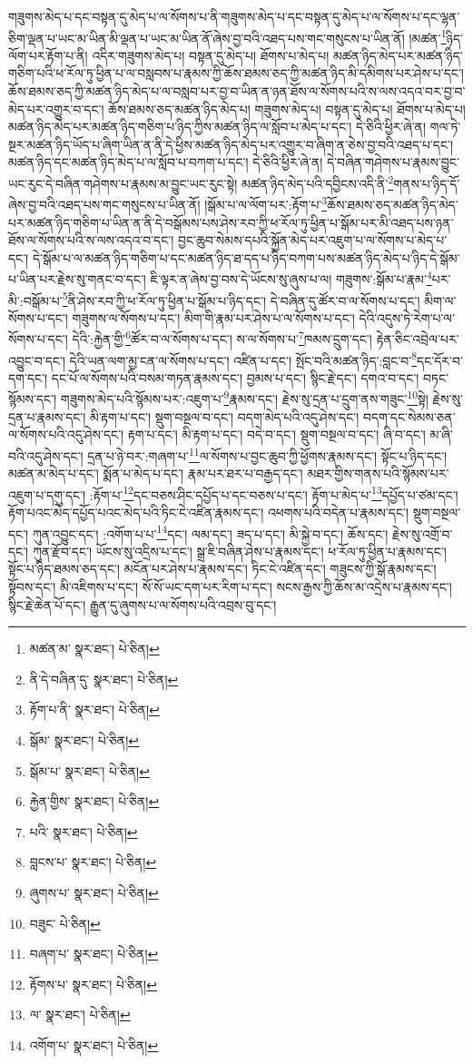 གཟུགས་མེད་པ་དང་བསྟན་དུ་མེད་པ་ལ་སོགས་པ་ནི་གཟུགས་མེད་པ་དང་བསྟན་དུ་མེད་པ་ལ་སོགས་པ་དང་ལྷན་ཅིག་ལྡན་པ་ཡང་མ་ཡིན་མི་ལྡན་པ་ཡང་མ་ཡིན་ནོ་ཞེས་བྱ་བའི་འཐད་པས་གང་གསུངས་པ་ཡིན་ནོ། །མཚན་\footnote{མཚན་མ་  སྣར་ཐང་།  པེ་ཅིན། }ཉིད་ལོག་པར་རྟོག་པ་ནི། འདིར་གཟུགས་མེད་པ། བསྟན་དུ་མེད་པ། ཐོགས་པ་མེད་པ། མཚན་ཉིད་མེད་པར་མཚན་ཉིད་གཅིག་པའི་ཕ་རོལ་ཏུ་ཕྱིན་པ་ལ་བསླབས་པ་རྣམས་ཀྱི་ཆོས་ཐམས་ཅད་ཀྱི་མཚན་ཉིད་མི་དམིགས་པར་ཤེས་པ་དང་། ཆོས་ཐམས་ཅད་ཀྱི་མཚན་ཉིད་མེད་པ་ལ་བསླབ་པར་བྱ་བ་ཡིན་ན་ཉན་ཐོས་ལ་སོགས་པའི་ས་ལས་འདའ་བར་བྱ་བ་མེད་པར་འགྱུར་བ་དང་། ཆོས་ཐམས་ཅད་མཚན་ཉིད་མེད་པ། གཟུགས་མེད་པ། བསྟན་དུ་མེད་པ། ཐོགས་པ་མེད་པ། མཚན་ཉིད་མེད་པར་མཚན་ཉིད་གཅིག་པ་ཉིད་ཀྱིས་མཚན་ཉིད་ལ་སློབ་པ་མེད་པ་དང་། དེ་ཅིའི་ཕྱིར་ཞེ་ན། གལ་ཏེ་སྔར་མཚན་ཉིད་ཡོད་པ་ཞིག་ཡིན་ན་ནི་དེ་ཕྱིས་མཚན་ཉིད་མེད་པར་འགྱུར་བ་ཞིག་ན་ཅེས་བྱ་བའི་འཐད་པ་དང་། མཚན་ཉིད་དང་མཚན་ཉིད་མེད་པ་ལ་སློབ་པ་བཀག་པ་དང་། དེ་ཅིའི་ཕྱིར་ཞེ་ན། དེ་བཞིན་གཤེགས་པ་རྣམས་བྱུང་ཡང་རུང་དེ་བཞིན་གཤེགས་པ་རྣམས་མ་བྱུང་ཡང་རུང་སྟེ། མཚན་ཉིད་མེད་པའི་དབྱིངས་འདི་ནི་\footnote{ནི་དེ་བཞིན་དུ་  སྣར་ཐང་།  པེ་ཅིན། }གནས་པ་ཉིད་དོ་ཞེས་བྱ་བའི་འཐད་པས་གང་གསུངས་པ་ཡིན་ནོ། །སྒོམ་པ་ལ་ལོག་པར་:རྟོག་པ་\footnote{རྟོག་པ་ནི་  སྣར་ཐང་།  པེ་ཅིན། }ཆོས་ཐམས་ཅད་མཚན་ཉིད་མེད་པར་མཚན་ཉིད་གཅིག་པ་ཡིན་ན་ནི་དེ་བསྒོམས་པས་ཤེས་རབ་ཀྱི་ཕ་རོལ་ཏུ་ཕྱིན་པ་སྒོམ་པར་མི་འཐད་པས་ཉན་ཐོས་ལ་སོགས་པའི་ས་ལས་འདའ་བ་དང་། བྱང་ཆུབ་སེམས་དཔའི་སྐྱོན་མེད་པར་འཇུག་པ་ལ་སོགས་པ་མེད་པ་དང་། དེ་སྒོམ་པ་ལ་མཚན་ཉིད་གཅིག་པ་དང་མཚན་ཉིད་ཐ་དད་པ་ཉིད་བཀག་པས་མཚན་ཉིད་མེད་པ་ཉིད་དེ་སྒོམ་པ་ཡིན་པར་རྗེས་སུ་གནང་བ་དང་། ཇི་ལྟར་ན་ཞེས་བྱ་བས་དེ་ཡོངས་སུ་ཞུས་པ་ལ། གཟུགས་:སྒོམ་པ་རྣམ་\footnote{སྒོམ་  སྣར་ཐང་།  པེ་ཅིན། }པར་མི་:བསྒོམ་པ་\footnote{སྒོམ་པ་  སྣར་ཐང་།  པེ་ཅིན། }ནི་ཤེས་རབ་ཀྱི་ཕ་རོལ་ཏུ་ཕྱིན་པ་སྒོམ་པ་ཉིད་དང་། དེ་བཞིན་དུ་ཚོར་བ་ལ་སོགས་པ་དང་། མིག་ལ་སོགས་པ་དང་། གཟུགས་ལ་སོགས་པ་དང་། མིག་གི་རྣམ་པར་ཤེས་པ་ལ་སོགས་པ་དང་། དེའི་འདུས་ཏེ་རེག་པ་ལ་སོགས་པ་དང་། དེའི་:རྐྱེན་གྱི་\footnote{རྐྱེན་གྱིས་  སྣར་ཐང་།  པེ་ཅིན། }ཚོར་བ་ལ་སོགས་པ་དང་། ས་ལ་སོགས་པ་\footnote{པའི་  སྣར་ཐང་།  པེ་ཅིན། }ཁམས་དྲུག་དང་། རྟེན་ཅིང་འབྲེལ་པར་འབྱུང་བ་དང་། དེའི་ཡན་ལག་མྱ་ངན་ལ་སོགས་པ་དང་། འཛིན་པ་དང་། སྤོང་བའི་མཚན་ཉིད་:བླང་བ་\footnote{བླངས་པ་  སྣར་ཐང་།  པེ་ཅིན། }དང་དོར་བ་དག་དང་། དང་པོ་ལ་སོགས་པའི་བསམ་གཏན་རྣམས་དང་། བྱམས་པ་དང་། སྙིང་རྗེ་དང་། དགའ་བ་དང་། བཏང་སྙོམས་དང་། གཟུགས་མེད་པའི་སྙོམས་པར་:འཇུག་པ་\footnote{ཞུགས་པ་  སྣར་ཐང་།  པེ་ཅིན། }རྣམས་དང་། རྗེས་སུ་དྲན་པ་དྲུག་ནས་གཟུང་\footnote{བཟུང་  པེ་ཅིན། }སྟེ། རྗེས་སུ་དྲན་པ་རྣམས་དང་། མི་རྟག་པ་དང་། སྡུག་བསྔལ་བ་དང་། བདག་མེད་པའི་འདུ་ཤེས་དང་། བདག་དང་སེམས་ཅན་ལ་སོགས་པའི་འདུ་ཤེས་དང་། རྟག་པ་དང་། མི་རྟག་པ་དང་། བདེ་བ་དང་། སྡུག་བསྔལ་བ་དང་། ཞི་བ་དང་། མ་ཞི་བའི་འདུ་ཤེས་དང་། དྲན་པ་ཉེ་བར་:གཞག་པ་\footnote{བཞག་པ་  སྣར་ཐང་།  པེ་ཅིན། }ལ་སོགས་པ་བྱང་ཆུབ་ཀྱི་ཕྱོགས་རྣམས་དང་། སྟོང་པ་ཉིད་དང་། མཚན་མ་མེད་པ་དང་། སྨོན་པ་མེད་པ་དང་། རྣམ་པར་ཐར་པ་བརྒྱད་དང་། མཐར་གྱིས་གནས་པའི་སྙོམས་པར་འཇུག་པ་དགུ་དང་། :རྟོག་པ་\footnote{རྟོགས་པ་  སྣར་ཐང་།  པེ་ཅིན། }དང་བཅས་ཤིང་དཔྱོད་པ་དང་བཅས་པ་དང་། རྟོག་པ་མེད་པ་\footnote{ལ་  སྣར་ཐང་།  པེ་ཅིན། }དཔྱོད་པ་ཙམ་དང་། རྟོག་པའང་མེད་དཔྱོད་པའང་མེད་པའི་ཏིང་ངེ་འཛིན་རྣམས་དང་། འཕགས་པའི་བདེན་པ་རྣམས་དང་། སྡུག་བསྔལ་དང་། ཀུན་འབྱུང་དང་། :འགོག་པ་པ་\footnote{འགོག་པ་  སྣར་ཐང་།  པེ་ཅིན། }དང་། ལམ་དང་། ཟད་པ་དང་། མི་སྐྱེ་བ་དང་། ཆོས་དང་། རྗེས་སུ་འགྲོ་བ་དང་། ཀུན་རྫོབ་དང་། ཡོངས་སུ་འདྲིས་པ་དང་། སྒྲ་ཇི་བཞིན་ཤེས་པ་རྣམས་དང་། ཕ་རོལ་ཏུ་ཕྱིན་པ་རྣམས་དང་། སྟོང་པ་ཉིད་ཐམས་ཅད་དང་། མངོན་པར་ཤེས་པ་རྣམས་དང་། ཏིང་ངེ་འཛིན་དང་། གཟུངས་ཀྱི་སྒོ་རྣམས་དང་། སྟོབས་དང་། མི་འཇིགས་པ་དང་། སོ་སོ་ཡང་དག་པར་རིག་པ་དང་། སངས་རྒྱས་ཀྱི་ཆོས་མ་འདྲེས་པ་རྣམས་དང་། སྙིང་རྗེ་ཆེན་པོ་དང་། རྒྱུན་དུ་ཞུགས་པ་ལ་སོགས་པའི་འབྲས་བུ་དང་། 